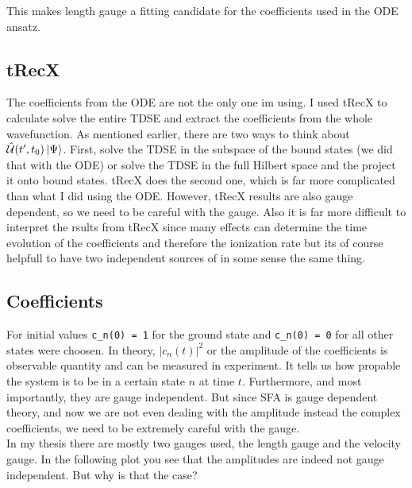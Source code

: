 This makes length gauge a fitting candidate for the coefficients used in the ODE ansatz.




\subsection{tRecX}






The coefficients from the ODE are not the only one im using. I used tRecX to calculate solve the entire TDSE and extract the coefficients from the whole wavefunction.
As mentioned earlier, there are two ways to think about $\hat{\mathcal{U}}(t',t_0)\ket{\Psi}$. 
First, solve the TDSE in the subspace of the bound states (we did that with the ODE) or solve the TDSE in the full Hilbert space and the project it onto bound states. 
tRecX does the second one, which is far more complicated than what I did using the ODE.
However, tRecX results are also gauge dependent, so we need to be careful with the gauge.
Also it is far more difficult to interpret the rsults from tRecX since many effects can determine the time evolution of the coefficients and therefore the ionization rate but its of course helpfull to have two independent sources of in some sense the same thing.







\subsection{Coefficients}
For initial values \texttt{c\_n(0) = 1} for the ground state and \texttt{c\_n(0) = 0} for all other states were choosen.
In theory, $|c_n(t)|^2$ or the amplitude of the coefficients is observable quantity and can be measured in experiment.
It tells us how propable the system is to be in a certain state $n$ at time $t$.
Furthermore, and most importantly, they are gauge independent.
But since SFA is gauge dependent theory, and now we are not even dealing with the amplitude instead the complex coefficients, we need to be extremely careful with the gauge.\\
In my thesis there are mostly two gauges used, the length gauge and the velocity gauge. 
In the following plot you see that the amplitudes are indeed not gauge independent. But why is that the case?\\\\

